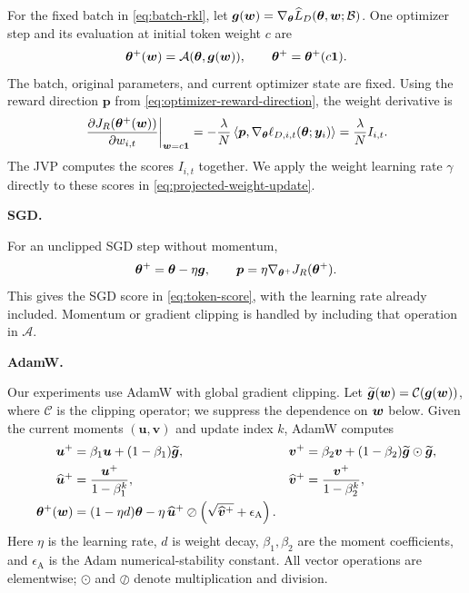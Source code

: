 \documentclass{article} %
\begin{document}
For the fixed batch in \cref{eq:batch-rkl}, let
\(\boldsymbol g(\bm{w})=\nabla_{\bm{\theta}}\widehat L_D(\bm{\theta},\bm{w};\mathcal B)\).
One optimizer step and its evaluation at initial token weight \(c\) are
\[
    \bm{\theta}^+(\bm{w})=\mathcal A(\bm{\theta},\boldsymbol g(\bm{w})),
    \qquad \bm{\theta}^+=\bm{\theta}^+(c\mathbf 1).
\]
The batch, original parameters, and current optimizer state are fixed.
Using the reward direction \(\boldsymbol p\) from
\cref{eq:optimizer-reward-direction}, the weight derivative is
\begin{equation}
    \left.\frac{\partial J_R(\bm{\theta}^+(\bm{w}))}{\partial w_{i,t}}
    \right|_{\bm{w}=c\mathbf 1}
    =-\frac{\lambda}{N}\left\langle
        \boldsymbol p,\nabla_{\bm{\theta}}\ell_{D,i,t}(\bm{\theta};\bm{y}_i)
    \right\rangle
    =\frac{\lambda}{N}I_{i,t}.
    \label{eq:general-optimizer-hypergradient}
\end{equation}
The JVP computes the scores \(I_{i,t}\) together. We apply the weight
learning rate \(\gamma\) directly to these scores in
\cref{eq:projected-weight-update}.

\noindent\textbf{SGD.}\enspace

For an unclipped SGD step without momentum,
\[
    \bm{\theta}^+
    =
    \bm{\theta}-\eta\boldsymbol{g},
    \qquad
    \boldsymbol{p}
    =
    \eta\nabla_{\bm{\theta}^+}J_R(\bm{\theta}^+).
\]
This gives the SGD score in \cref{eq:token-score}, with the learning rate
already included. Momentum or gradient clipping is handled by including
that operation in \(\mathcal A\).

\noindent\textbf{AdamW.}\enspace

Our experiments use AdamW with global gradient clipping. Let
\(\widetilde{\boldsymbol{g}}(\bm{w})=\mathcal C(\boldsymbol{g}(\bm{w}))\), where \(\mathcal C\) is the
clipping operator; we suppress the dependence on \(\bm{w}\) below. Given the current moments
\((\boldsymbol{u},\boldsymbol{v})\) and update index \(k\), AdamW computes
\begin{align*}
    \boldsymbol{u}^+
    &=
    \beta_1\boldsymbol{u}
    +(1-\beta_1)\widetilde{\boldsymbol{g}},
    &
    \boldsymbol{v}^+
    &=
    \beta_2\boldsymbol{v}
    +(1-\beta_2)\widetilde{\boldsymbol{g}}
        \odot\widetilde{\boldsymbol{g}},
    \nonumber\\
    \widehat{\boldsymbol{u}}^+
    &=
    \frac{\boldsymbol{u}^+}{1-\beta_1^k},
    &
    \widehat{\boldsymbol{v}}^+
    &=
    \frac{\boldsymbol{v}^+}{1-\beta_2^k},
    \nonumber\\
    \bm{\theta}^+(\bm{w})
    &=
    (1-\eta d)\bm{\theta}
    -
    \eta\,
    \widehat{\boldsymbol{u}}^+
    \oslash
    \left(\sqrt{\widehat{\boldsymbol{v}}^+}
    +\epsilon_{\mathrm{A}}\right).
\end{align*}
Here \(\eta\) is the learning rate, \(d\) is weight decay,
\(\beta_1,\beta_2\) are the moment coefficients, and
\(\epsilon_{\mathrm{A}}\) is the Adam numerical-stability constant. All
vector operations are elementwise; \(\odot\) and \(\oslash\) denote
multiplication and division.
\end{document}
